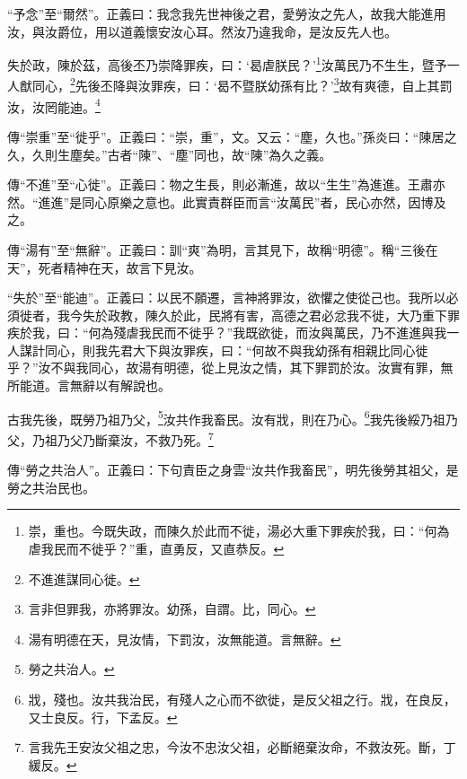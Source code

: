 {\noindent\shu{}\fzkt “予念”至“爾然”。正義曰：我念我先世神後之君，愛勞汝之先人，故我大能進用汝，與汝爵位，用以道義懷安汝心耳。然汝乃違我命，是汝反先人也。 \par}

失於政，陳於茲，高後丕乃崇降罪疾，曰：‘曷虐朕民？’\footnote{崇，重也。今既失政，而陳久於此而不徙，湯必大重下罪疾於我，曰：“何為虐我民而不徙乎？”重，直勇反，又直恭反。}汝萬民乃不生生，暨予一人猷同心，\footnote{不進進謀同心徙。}先後丕降與汝罪疾，曰：‘曷不暨朕幼孫有比？’\footnote{言非但罪我，亦將罪汝。幼孫，自謂。比，同心。}故有爽德，自上其罰汝，汝罔能迪。\footnote{湯有明德在天，見汝情，下罰汝，汝無能道。言無辭。}

{\noindent\zhuan{}\fzbyks 傳“崇重”至“徙乎”。正義曰：“崇，重”，文。又云：“塵，久也。”孫炎曰：“陳居之久，久則生塵矣。”古者“陳”、“塵”同也，故“陳”為久之義。 \par}

{\noindent\zhuan{}\fzbyks 傳“不進”至“心徙”。正義曰：物之生長，則必漸進，故以“生生”為進進。王肅亦然。“進進”是同心原樂之意也。此實責群臣而言“汝萬民”者，民心亦然，因博及之。 \par}

{\noindent\zhuan{}\fzbyks 傳“湯有”至“無辭”。正義曰：訓“爽”為明，言其見下，故稱“明德”。稱“三後在天”，死者精神在天，故言下見汝。 \par}

{\noindent\shu{}\fzkt “失於”至“能迪”。正義曰：以民不願遷，言神將罪汝，欲懼之使從己也。我所以必須徙者，我今失於政教，陳久於此，民將有害，高德之君必忿我不徙，大乃重下罪疾於我，曰：“何為殘虐我民而不徙乎？”我既欲徙，而汝與萬民，乃不進進與我一人謀計同心，則我先君大下與汝罪疾，曰：“何故不與我幼孫有相親比同心徙乎？”汝不與我同心，故湯有明德，從上見汝之情，其下罪罰於汝。汝實有罪，無所能道。言無辭以有解說也。 \par}

古我先後，既勞乃祖乃父，\footnote{勞之共治人。}汝共作我畜民。汝有戕，則在乃心。\footnote{戕，殘也。汝共我治民，有殘人之心而不欲徙，是反父祖之行。戕，在良反，又士良反。行，下孟反。}我先後綏乃祖乃父，乃祖乃父乃斷棄汝，不救乃死。\footnote{言我先王安汝父祖之忠，今汝不忠汝父祖，必斷絕棄汝命，不救汝死。斷，丁緩反。}

{\noindent\zhuan{}\fzbyks 傳“勞之共治人”。正義曰：下句責臣之身雲“汝共作我畜民”，明先後勞其祖父，是勞之共治民也。 \par}

